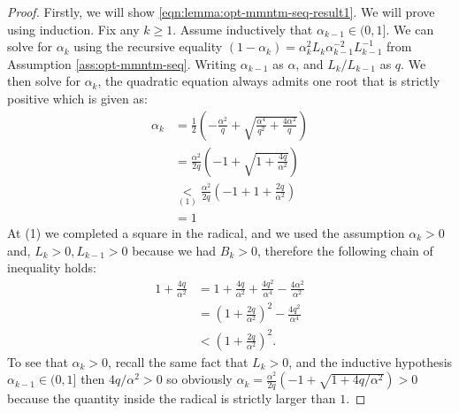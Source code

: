 \documentclass[12pt]{article}
\begin{document}
        \begin{proof}
            Firstly, we will show \eqref{eqn:lemma:opt-mmntm-seq-result1}. 
            We will prove using induction.
            Fix any $k \ge 1$. 
            Assume inductively that $\alpha_{k - 1} \in (0, 1]$. 
            We can solve for $\alpha_k$ using the recursive equality $(1 - \alpha_k) = \alpha_{k}^2L_k\alpha_{k - 1}^{-2}L_{k - 1}^{-1}$ from Assumption \ref{ass:opt-mmntm-seq}.
            Writing $\alpha_{k - 1}$ as $\alpha$, and $L_k/L_{k - 1}$ as $q$.
            We then solve for $\alpha_{k}$, the quadratic equation always admits one root that is strictly positive which is given as: 
            \begin{align*}
                \alpha_k &= \frac{1}{2}\left(
                    - \frac{\alpha^2}{q} + \sqrt{
                        \frac{\alpha^4}{q^2} + \frac{4\alpha^2}{q}
                    }
                \right)
                \\
                &= \frac{\alpha^2}{2q}\left(
                    - 1 + \sqrt{1 + \frac{4q}{\alpha^2}}
                \right)
                \\
                &\underset{(1)}{<}
                \frac{\alpha^2}{2q}\left(
                    -1 + 1 + \frac{2q}{\alpha^2}
                \right)
                \\
                &= 1
            \end{align*}
            At (1) we completed a square in the radical, and we used the assumption $\alpha_k > 0$ and, $L_k > 0, L_{k - 1} > 0$ because we had $B_k > 0$, therefore the following chain of inequality holds: 
            \begin{align*}
                1 + \frac{4q}{\alpha^2} &= 
                1 + \frac{4q}{\alpha^2} + \frac{4q^2}{\alpha^4} - \frac{4\alpha^2}{\alpha^2}
                \\
                &= \left(
                    1 + \frac{2q}{\alpha^2}
                \right)^2 - \frac{4q^2}{\alpha^4} 
                \\
                &< \left(
                    1 + \frac{2q}{\alpha^2}  
                \right)^2. 
            \end{align*}
            To see that $\alpha_k > 0$, recall the same fact that $L_k > 0$, and the inductive hypothesis $\alpha_{k - 1} \in (0, 1]$ then $4q/\alpha^2 > 0$ so obviously $\alpha_k = \frac{\alpha^2}{2q}\left(-1 + \sqrt{1 + 4q/\alpha^2}\right) > 0$ because the quantity inside the radical is strictly larger than $1$. 

\end{proof}
\end{document}
